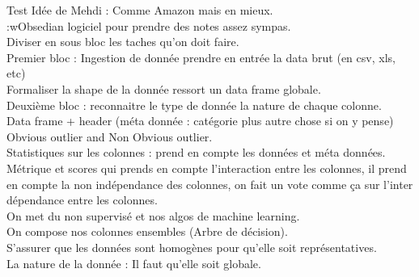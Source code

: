\documentclass{article}
\begin{document}
Test
Idée de Mehdi : Comme Amazon mais en mieux. \\
:wObsedian logiciel pour prendre des notes assez sympas.  \\
	Diviser en sous bloc les taches qu’on doit faire. \\
	Premier bloc : Ingestion de donnée prendre en entrée la data brut (en csv, xls, etc) \\
	Formaliser la shape de la donnée ressort un data frame globale.\\
	Deuxième bloc : reconnaitre le type de donnée la nature de chaque colonne. \\
	Data frame + header (méta donnée : catégorie plus autre chose si on y pense)\\
	Obvious outlier and Non Obvious outlier.  \\
	Statistiques sur les colonnes : prend en compte les données et méta données.\\
	Métrique et scores qui prends en compte l’interaction entre les colonnes, il prend en compte la non indépendance des colonnes, on fait un vote comme ça sur l’inter dépendance entre les colonnes. \\
	On met du non supervisé et nos algos de machine learning. \\
On compose nos colonnes ensembles (Arbre de décision).  \\
S’assurer que les données sont homogènes pour qu’elle soit représentatives. \\
La nature de la donnée : Il faut qu’elle soit globale. \\
\end{document}

